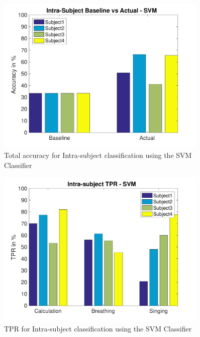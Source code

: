 		\begin{figure}[hbtp]
	    	\centering
	    	\includegraphics[width=0.90\textwidth]{Chapter-4/base_ts}
	    	\caption{Total accuracy for Intra-subject classification using the SVM Classifier}
	    	\label{fig:chap4IntraST}
    	\end{figure}

    	\begin{figure}[hbtp]
	    	\centering
	    	\includegraphics[width=0.9\textwidth]{Chapter-4/base_tprs}
	    	\caption{TPR for Intra-subject classification using the SVM Classifier}
	    	\label{fig:chap4IntraSTPR}
    	\end{figure}

